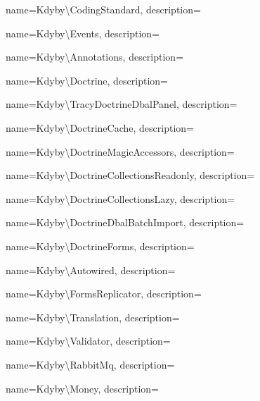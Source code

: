  {
  name={K\-dy\-by\textbackslash{}\-Co\-din\-g\-S\-ta\-n\-da\-r\-d},
  description={} }

 {
  name={K\-dy\-by\textbackslash{}\-E\-ven\-ts},
  description={} }

 {
  name={K\-dy\-by\textbackslash{}\-Anno\-ta\-ti\-on\-s},
  description={} }

 {
  name={K\-dy\-by\textbackslash{}\-Doc\-tri\-ne},
  description={} }

 {
  name={K\-dy\-by\textbackslash{}\-Tra\-cy\-Doc\-tri\-ne\-D\-b\-a\-l\-Pa\-ne\-l},
  description={} }

 {
  name={K\-dy\-by\textbackslash{}\-Doc\-tri\-ne\-Ca\-che},
  description={} }

 {
  name={K\-dy\-by\textbackslash{}\-Doc\-tri\-ne\-Ma\-gic\-Acces\-sor\-s},
  description={} }

 {
  name={K\-dy\-by\textbackslash{}\-Doc\-tri\-ne\-Collec\-ti\-ons\-Read\-on\-ly},
  description={} }

 {
  name={K\-dy\-by\textbackslash{}\-Doc\-tri\-ne\-Collec\-ti\-ons\-La\-zy},
  description={} }

 {
  name={K\-dy\-by\textbackslash{}\-Doc\-tri\-ne\-Dbal\-Batch\-Im\-port},
  description={} }

 {
  name={K\-dy\-by\textbackslash{}\-Doc\-tri\-ne\-Forms},
  description={} }

 {
  name={K\-dy\-by\textbackslash{}\-Auto\-wi\-red},
  description={} }

 {
  name={K\-dy\-by\textbackslash{}\-Forms\-Re\-pli\-ca\-tor},
  description={} }

 {
  name={K\-dy\-by\textbackslash{}\-Tran\-sla\-tion},
  description={} }

 {
  name={K\-dy\-by\textbackslash{}\-Va\-li\-da\-tor},
  description={} }

 {
  name={K\-dy\-by\textbackslash{}\-Ra\-bbit\-Mq},
  description={} }

 {
  name={K\-dy\-by\textbackslash{}\-Mo\-ney},
  description={} }

